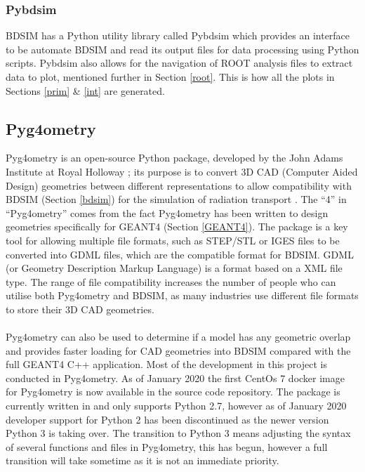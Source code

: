 \documentclass[12pt,a4paper]{article}
\begin{document}
\subsubsection{Pybdsim}
\label{pyb}
BDSIM has a Python utility library called Pybdsim which provides an interface to be automate BDSIM and read its output files for data processing using Python scripts. Pybdsim also allows for the navigation of ROOT analysis files to extract data to plot, mentioned further in Section \ref{root}. This is how all the plots in Sections \ref{prim} \& \ref{int} are generated.



\subsection{Pyg4ometry}
\label{pyg}
Pyg4ometry is an open-source Python package, developed by the John Adams Institute at Royal Holloway \cite{jai}; its purpose is to convert 3D CAD (Computer Aided Design) geometries between different representations to allow compatibility with BDSIM (Section \ref{bdsim}) for the simulation of radiation transport \cite{pyg4om}. The ``4'' in ``Pyg4ometry'' comes from the fact Pyg4ometry has been written to design geometries specifically for GEANT4 (Section \ref{GEANT4}). The package is a key tool for allowing multiple file formats, such as STEP/STL or IGES files to be converted into GDML files, which are the compatible format for BDSIM. GDML (or Geometry Description Markup Language) is a format based on a XML file type. The range of file compatibility increases the number of people who can utilise both Pyg4ometry and BDSIM, as many industries use different file formats to store their 3D CAD geometries.
\\\\
\noindent Pyg4ometry can also be used to determine if a model has any geometric overlap and provides faster loading for CAD geometries into BDSIM compared with the full GEANT4 C++ application. Most of the development in this project is conducted in Pyg4ometry. As of January 2020 the first CentOs 7 docker image for Pyg4ometry is now available in the source code repository. The package is currently written in and only supports Python 2.7, however as of January 2020 developer support for Python 2 has been discontinued as the newer version Python 3 is taking over. The transition to Python 3 means adjusting the syntax of several functions and files in Pyg4ometry, this has begun, however a full transition will take sometime as it is not an immediate priority. 
\end{document}
